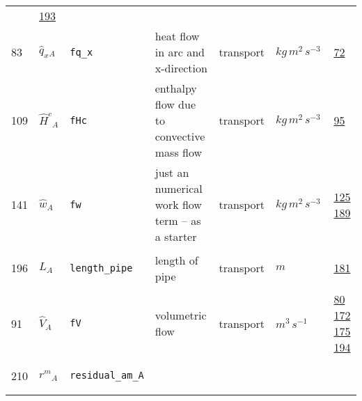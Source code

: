 \begin{longtable}{|p{1cm}|p{2.5cm}|p{4.5cm}|p{8cm}|p{3.0cm}|p{3cm}|p{1cm}|}
             &                 \hyperlink{"e:193"}{ 193 }
                 \\
            83
             & \hypertarget{"v:83"}{ $ {{\hat{q}_x}}{_{A}} $}
             & \verb|fq_x|
             & heat flow in arc and x-direction
             & \begin{lay}transport \end{lay}
             & $ kg \,m^{2} \,s^{-3} \, $
             &                 \hyperlink{"e:72"}{ 72 }
                 \\
            109
             & \hypertarget{"v:109"}{ $ {{\hat{H}^c}}{_{A}} $}
             & \verb|fHc|
             & enthalpy flow due to convective mass flow
             & \begin{lay}transport \end{lay}
             & $ kg \,m^{2} \,s^{-3} \, $
             &                 \hyperlink{"e:95"}{ 95 }
                 \\
            141
             & \hypertarget{"v:141"}{ $ {{\hat{w}}}{_{A}} $}
             & \verb|fw|
             & just an numerical work flow term -- as a starter
             & \begin{lay}transport \end{lay}
             & $ kg \,m^{2} \,s^{-3} \, $
             &                 \hyperlink{"e:125"}{ 125 }
                                 \hyperlink{"e:189"}{ 189 }
                 \\
            196
             & \hypertarget{"v:196"}{ $ {L}{_{A}} $}
             & \verb|length_pipe|
             & length of pipe
             & \begin{lay}transport \end{lay}
             & $ m  $
             &                 \hyperlink{"e:181"}{ 181 }
                 \\
            91
             & \hypertarget{"v:91"}{ $ {{\hat{V}}}{_{A}} $}
             & \verb|fV|
             & volumetric flow
             & \begin{lay}transport \end{lay}
             & $ m^{3} \,s^{-1} \, $
             &                 \hyperlink{"e:80"}{ 80 }
                                 \hyperlink{"e:172"}{ 172 }
                                 \hyperlink{"e:175"}{ 175 }
                                 \hyperlink{"e:194"}{ 194 }
                 \\
            210
             & \hypertarget{"v:210"}{ $ {{r^m}}{_{A}} $}
             & \verb|residual_am_A|

\end{longtable}
